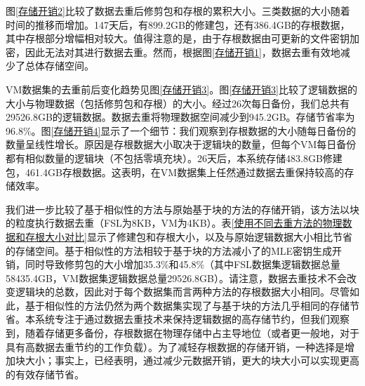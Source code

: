 \documentclass[promaster]{thesis-uestc}
\begin{document}
图\ref{存储开销2}比较了数据去重后修剪包和存根的累积大小。三类数据的大小随着时间的推移而增加。147天后，有899.2GB的修建包，还有386.4GB的存根数据，其中存根部分增幅相对较大。值得注意的是，由于存根数据由可更新的文件密钥加密，因此无法对其进行数据去重。然而，根据图\ref{存储开销1}，数据去重有效地减少了总体存储空间。

VM数据集的去重前后变化趋势见图\ref{存储开销3}。图\ref{存储开销3}比较了逻辑数据的大小与物理数据（包括修剪包和存根）的大小。经过26次每日备份，我们总共有29526.8GB的逻辑数据。数据去重将物理数据空间减少到945.2GB。存储节省率为96.8\%。图\ref{存储开销4}显示了一个细节：我们观察到存根数据的大小随每日备份的数量呈线性增长。原因是存根数据大小取决于逻辑块的数量，但每个VM每日备份都有相似数量的逻辑块（不包括零填充块）。26天后，本系统存储483.8GB修建包，461.4GB存根数据。这表明，在VM数据集上任然通过数据去重保持较高的存储效率。

我们进一步比较了基于相似性的方法与原始基于块的方法的存储开销，该方法以块的粒度执行数据去重（FSL为8KB，VM为4KB）。表\ref{使用不同去重方法的物理数据和存根大小对比}显示了修建包和存根大小，以及与原始逻辑数据大小相比节省的存储空间。基于相似性的方法相较于基于块的方法减小了的MLE密钥生成开销，同时导致修剪包的大小增加35.3\%和45.8\%（其中FSL数据集逻辑数据总量58435.4GB，VM数据集逻辑数据总量29526.8GB）。请注意，数据去重技术不会改变逻辑块的总数，因此对于每个数据集而言两种方法的存根数据大小相同。尽管如此，基于相似性的方法仍然为两个数据集实现了与基于块的方法几乎相同的存储节省。本系统专注于通过数据去重技术来保持逻辑数据的高存储节约，但我们观察到，随着存储更多备份，存根数据在物理存储中占主导地位（或者更一般地，对于具有高数据去重节约的工作负载）。为了减轻存根数据的存储开销，一种选择是增加块大小；事实上，已经表明，通过减少元数据开销，更大的块大小可以实现更高的有效存储节省。
\end{document}
